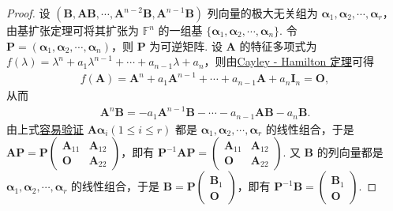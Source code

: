 \documentclass[../../main.tex]{subfiles}
\begin{document}
\begin{proof}
设 $(\boldsymbol{B},\boldsymbol{A}\boldsymbol{B},\cdots,\boldsymbol{A}^{n - 2}\boldsymbol{B},\boldsymbol{A}^{n - 1}\boldsymbol{B})$ 列向量的极大无关组为 $\boldsymbol{\alpha}_1,\boldsymbol{\alpha}_2,\cdots,\boldsymbol{\alpha}_r$，由基扩张定理可将其扩张为 $\mathbb{F}^n$ 的一组基 $\{\boldsymbol{\alpha}_1,\boldsymbol{\alpha}_2,\cdots,\boldsymbol{\alpha}_n\}$. 令 $\boldsymbol{P}=(\boldsymbol{\alpha}_1,\boldsymbol{\alpha}_2,\cdots,\boldsymbol{\alpha}_n)$，则 $\boldsymbol{P}$ 为可逆矩阵. 设 $\boldsymbol{A}$ 的特征多项式为 $f(\lambda)=\lambda^n + a_1\lambda^{n - 1}+\cdots + a_{n - 1}\lambda + a_n$，则由\hyperref[theorem:Cayley-Hamilton定理]{Cayley - Hamilton 定理}可得
\begin{align*}
f(\boldsymbol{A})=\boldsymbol{A}^n + a_1\boldsymbol{A}^{n - 1}+\cdots + a_{n - 1}\boldsymbol{A}+a_n\boldsymbol{I}_n=\boldsymbol{O},
\end{align*}
从而
\begin{align}\label{equation12312434-1.1}
\boldsymbol{A}^n\boldsymbol{B}=-a_1\boldsymbol{A}^{n - 1}\boldsymbol{B}-\cdots - a_{n - 1}\boldsymbol{A}\boldsymbol{B}-a_n\boldsymbol{B}.    
\end{align}
由上式\hyperlink{例题0.7容易验证的原因}{容易验证} $\boldsymbol{A}\boldsymbol{\alpha}_i(1\leq i\leq r)$ 都是 $\boldsymbol{\alpha}_1,\boldsymbol{\alpha}_2,\cdots,\boldsymbol{\alpha}_r$ 的线性组合，于是 $\boldsymbol{A}\boldsymbol{P}=\boldsymbol{P}\begin{pmatrix}
\boldsymbol{A}_{11} & \boldsymbol{A}_{12} \\
\boldsymbol{O} & \boldsymbol{A}_{22}
\end{pmatrix}$，即有 $\boldsymbol{P}^{-1}\boldsymbol{A}\boldsymbol{P}=\begin{pmatrix}
\boldsymbol{A}_{11} & \boldsymbol{A}_{12} \\
\boldsymbol{O} & \boldsymbol{A}_{22}
\end{pmatrix}$. 又 $\boldsymbol{B}$ 的列向量都是 $\boldsymbol{\alpha}_1,\boldsymbol{\alpha}_2,\cdots,\boldsymbol{\alpha}_r$ 的线性组合，于是 $\boldsymbol{B}=\boldsymbol{P}\begin{pmatrix}
\boldsymbol{B}_1 \\
\boldsymbol{O}
\end{pmatrix}$，即有 $\boldsymbol{P}^{-1}\boldsymbol{B}=\begin{pmatrix}
\boldsymbol{B}_1 \\
\boldsymbol{O}
\end{pmatrix}$.
\end{proof}
\end{document}
